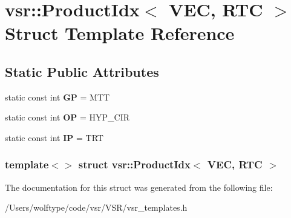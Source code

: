 \hypertarget{structvsr_1_1_product_idx_3_01_v_e_c_00_01_r_t_c_01_4}{\section{vsr\-:\-:Product\-Idx$<$ V\-E\-C, R\-T\-C $>$ Struct Template Reference}
\label{structvsr_1_1_product_idx_3_01_v_e_c_00_01_r_t_c_01_4}
}
\subsection*{Static Public Attributes}
\begin{DoxyCompactItemize}
\item 
\hypertarget{structvsr_1_1_product_idx_3_01_v_e_c_00_01_r_t_c_01_4_ae02aacd0ffc6e0e8b8315146f8d96278}{static const int {\bfseries G\-P} = M\-T\-T}\label{structvsr_1_1_product_idx_3_01_v_e_c_00_01_r_t_c_01_4_ae02aacd0ffc6e0e8b8315146f8d96278}

\item 
\hypertarget{structvsr_1_1_product_idx_3_01_v_e_c_00_01_r_t_c_01_4_a4c3df33b065439dfb119e4258babb543}{static const int {\bfseries O\-P} = H\-Y\-P\-\_\-\-C\-I\-R}\label{structvsr_1_1_product_idx_3_01_v_e_c_00_01_r_t_c_01_4_a4c3df33b065439dfb119e4258babb543}

\item 
\hypertarget{structvsr_1_1_product_idx_3_01_v_e_c_00_01_r_t_c_01_4_a86996f41bd32acb16061c0ecfe45b60c}{static const int {\bfseries I\-P} = T\-R\-T}\label{structvsr_1_1_product_idx_3_01_v_e_c_00_01_r_t_c_01_4_a86996f41bd32acb16061c0ecfe45b60c}

\end{DoxyCompactItemize}
\subsubsection*{template$<$$>$ struct vsr\-::\-Product\-Idx$<$ V\-E\-C, R\-T\-C $>$}



The documentation for this struct was generated from the following file\-:\begin{DoxyCompactItemize}
\item 
/\-Users/wolftype/code/vsr/\-V\-S\-R/vsr\-\_\-templates.\-h\end{DoxyCompactItemize}
